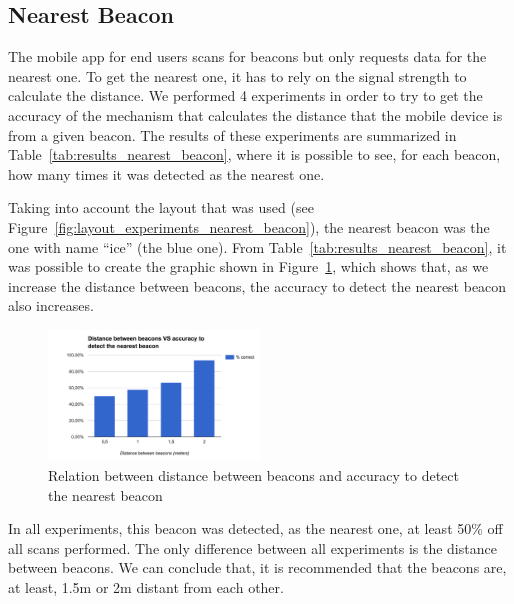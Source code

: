 \subsection{Nearest Beacon}
\label{sub:results_nearest_beacon}
The mobile app for end users scans for beacons but only requests data for the nearest one. To get the nearest one, it has to rely on the signal strength to calculate the distance. We performed 4 experiments in order to try to get the accuracy of the mechanism that calculates the distance that the mobile device is from a given beacon.
The results of these experiments are summarized in Table~\ref{tab:results_nearest_beacon}, where it is possible to see, for each beacon, how many times it was detected as the nearest one.

Taking into account the layout that was used (see Figure~\ref{fig:layout_experiments_nearest_beacon}), the nearest beacon was the one with name ``ice'' (the blue one).
From Table~\ref{tab:results_nearest_beacon}, it was possible to create the graphic shown in Figure~\ref{fig:results_experiments_nearest_beacon}, which shows that, as we increase the distance between beacons, the accuracy to detect the nearest beacon also increases.



\begin{figure}[!ht]
  \centering
    \includegraphics[width=0.5\textwidth, keepaspectratio]{images/results_nearest_beacon}
    \caption{Relation between distance between beacons and accuracy to detect the nearest beacon}
    \label{fig:results_experiments_nearest_beacon}
\end{figure}

In all experiments, this beacon was detected, as the nearest one, at least 50\% off all scans performed.
The only difference between all experiments is the distance between beacons.
We can conclude that, it is recommended that the beacons are, at least, 1.5m or 2m distant from each other.



